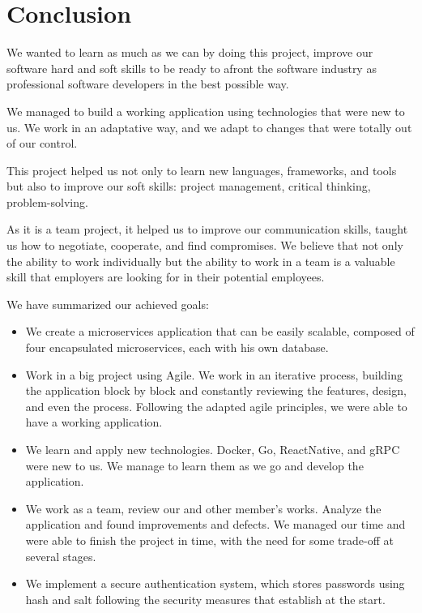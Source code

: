 \chapter{Conclusion}

We wanted to learn as much as we can by doing this project, improve our software hard and soft skills to be ready to afront the software industry as professional software developers in the best possible way.

We managed to build a working application using technologies that were new to us. We work in an adaptative way, and we adapt to changes that were totally out of our control.

This project helped us not only to learn new languages, frameworks, and tools but also to improve our soft skills: project management, critical thinking, problem-solving.

As it is a team project, it helped us to improve our communication skills, taught us how to negotiate, cooperate, and find compromises. We believe that not only the ability to work individually but the ability to work in a team is a valuable skill that employers are looking for in their potential employees.

We have summarized our achieved goals:
\begin{itemize}
 

	\item We create a microservices application that can be easily scalable, composed of four encapsulated microservices, each with his own database.

	\item Work in a big project using Agile. We work in an iterative process, building the application block by block and constantly reviewing the features, design, and even the process. Following the adapted agile principles, we were able to have a working application.

	\item We learn and apply new technologies. Docker, Go, ReactNative, and gRPC were new to us. We manage to learn them as we go and develop the application. 

	\item We work as a team, review our and other member's works. Analyze the application and found improvements and defects. We managed our time and were able to finish the project in time, with the need for some trade-off at several stages.

	\item We implement a secure authentication system, which stores passwords using hash and salt following the security measures that establish at the start.

\end{itemize}

